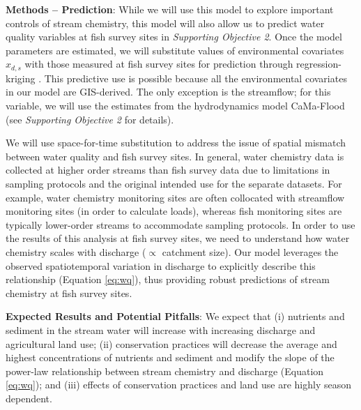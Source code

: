 \documentclass[12pt, class=article, crop=false]{standalone}
\begin{document}
\textbf{Methods -- Prediction}: While we will use this model to explore important controls of stream chemistry, this model will also allow us to predict water quality variables at fish survey sites in \textit{Supporting Objective 2}.
Once the model parameters are estimated, we will substitute values of environmental covariates $x_{d,s}$ with those measured at fish survey sites for prediction through regression-kriging \citep{hengl_about_2007}.
This predictive use is possible because all the environmental covariates in our model are GIS-derived.
The only exception is the streamflow; for this variable, we will use the estimates from the hydrodynamics model CaMa-Flood (see \textit{Supporting Objective 2} for details).

We will use space-for-time substitution to address the issue of spatial mismatch between water quality and fish survey sites.
In general, water chemistry data is collected at higher order streams than fish survey data due to limitations in sampling protocols and the original intended use for the separate datasets. 
For example, water chemistry monitoring sites are often collocated with streamflow monitoring sites (in order to calculate loads), whereas fish monitoring sites are typically lower-order streams to accommodate sampling protocols. 
In order to use the results of this analysis at fish survey sites, we need to understand how water chemistry scales with discharge ($\propto$ catchment size). 
Our model leverages the observed spatiotemporal variation in discharge to explicitly describe this relationship (Equation \ref{eq:wq}), thus providing robust predictions of stream chemistry at fish survey sites.

\textbf{Expected Results and Potential Pitfalls}: We expect that (i) nutrients and sediment in the stream water will increase with increasing discharge and agricultural land use; (ii) conservation practices will decrease the average and highest concentrations of nutrients and sediment and modify the slope of the power-law relationship between stream chemistry and discharge (Equation \ref{eq:wq}); and (iii) effects of conservation practices and land use are highly season dependent.
\end{document}

